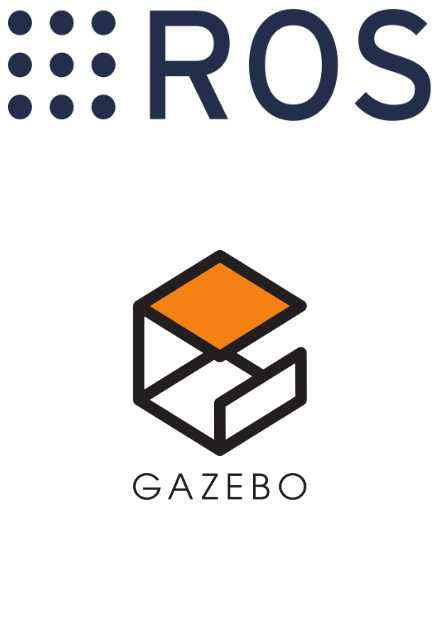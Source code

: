 \begin{figure}[!h]
	\begin{minipage}[t]{0.5\textwidth}
		\includegraphics[valign=c,width=\textwidth]{./figure/ROS.png}
	\end{minipage}
	\begin{minipage}[t]{0.5\textwidth}
		\includegraphics[valign=c,width=\textwidth]{./figure/GAZEBO.png}
	\end{minipage}
\end{figure}